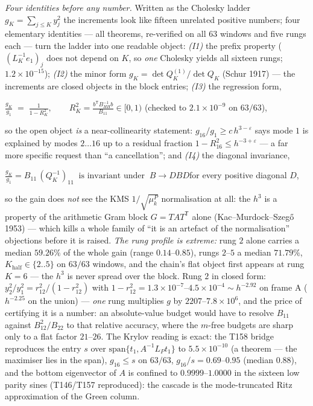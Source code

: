 \documentclass[11pt,a4paper]{article}
\begin{document}
\emph{Four identities before any number.} Written as the Cholesky ladder
$g_K=\sum_{j\le K}y_j^2$ the increments look like fifteen unrelated positive
numbers; four elementary identities --- all theorems, re-verified on all $63$
windows and five rungs each --- turn the ladder into one readable object:
\emph{(I1)} the prefix property ($(L_K^{-1}e_1)_j$ does not depend on $K$, so
\emph{one} Cholesky yields all sixteen rungs; $1.2\times10^{-15}$);
\emph{(I2)} the minor form $g_K=\det Q_K^{(1)}/\det Q_K$ (Schur 1917) --- the
increments are closed objects in the block entries; \emph{(I3)} the
regression form,
\begin{keyeq}$\displaystyle
\frac{g_K}{g_1}\;=\;\frac1{1-R_K^2},\qquad
R_K^2=\frac{b^{\mathsf T}B_{HH}^{-1}b}{B_{11}}\in[0,1)$
\quad(checked to $2.1\times10^{-9}$ on $63/63$),
\end{keyeq}
\noindent so the open object \emph{is} a near-collinearity statement:
$g_{16}/g_1\ge c\,h^{3-\varepsilon}$ says mode $1$ is explained by modes
$2\ldots16$ up to a residual fraction $1-R_{16}^2\le h^{-3+\varepsilon}$ ---
a far more specific request than ``a cancellation''; and \emph{(I4)} the
diagonal invariance,
\begin{keyeq}$\displaystyle
\frac{g_K}{g_1}=B_{11}\,(Q_K^{-1})_{11}\ \text{ is invariant under }\
B\to DBD$\quad for every positive diagonal $D$,
\end{keyeq}
\noindent so the gain does \emph{not} see the KMS $1/\sqrt{\mu^P_k}$
normalisation at all: the $h^3$ is a property of the arithmetic Gram block
$G=TAT^{\mathsf T}$ alone (Kac--Murdock--Szeg\H{o} 1953) --- which kills a
whole family of ``it is an artefact of the normalisation'' objections before
it is raised. \emph{The rung profile is extreme:} rung $2$ alone carries a
median $59.26\%$ of the whole gain (range $0.14$--$0.85$), rungs $2$--$5$ a
median $71.79\%$, $K_{\mathrm{half}}\in\{2..5\}$ on $63/63$ windows, and the
chain's flat object first appears at rung $K=6$ --- the $h^3$ is never spread
over the block. Rung $2$ in closed form: $y_2^2/y_1^2=r_{12}^2/(1-r_{12}^2)$
with $1-r_{12}^2=1.3\times10^{-7}$--$4.5\times10^{-4}\sim h^{-2.92}$ on frame
A ($h^{-2.25}$ on the union) --- \emph{one} rung multiplies $g$ by
$2207$--$7.8\times10^{6}$, and the price of certifying it is a number: an
absolute-value budget would have to resolve $B_{11}$ against
$B_{12}^2/B_{22}$ to that relative accuracy, where the $m$-free budgets are
sharp only to a flat factor $21$--$26$. The Krylov reading is exact: the T158
bridge reproduces the entry $s$ over $\mathrm{span}\{t_1,A^{-1}L_Pt_1\}$ to
$5.5\times10^{-10}$ (a theorem --- the maximiser lies in the span),
$g_{16}\le s$ on $63/63$, $g_{16}/s=0.69$--$0.95$ (median $0.88$), and the
bottom eigenvector of $A$ is confined to $0.9999$--$1.0000$ in the sixteen
low parity sines (T146/T157 reproduced): the cascade is the mode-truncated
Ritz approximation of the Green column.
\end{document}
